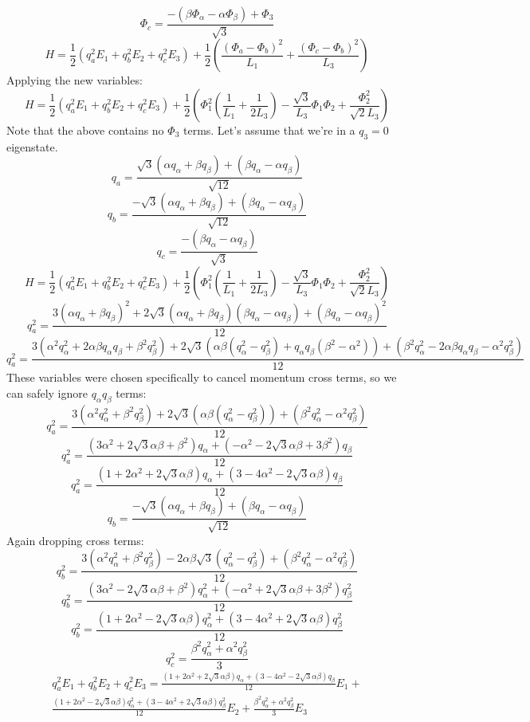 \documentclass[final]{article}
\begin{document}
\[\Phi_c=\frac{-(\beta \Phi_\alpha-\alpha \Phi_\beta)+\Phi_3}{\sqrt{3}}\]
\[H=\frac{1}{2}\left(q_a^2 E_1+q_b^2E_2+q_c^2E_3\right)+
\frac{1}{2}\left(\frac{(\Phi_a-\Phi_b)^2}{L_1}+\frac{(\Phi_c-\Phi_b)^2}{L_3}\right)\]
Applying the new variables:
\[H=\frac{1}{2}\left(q_a^2 E_1+ q_b^2 E_2+q_c^2 E_3\right)+
\frac{1}{2}\left(\Phi_1^2\left(\frac{1}{L_1}+\frac{1}{2L_3}\right)-\frac{\sqrt{3}}{L_3}\Phi_1\Phi_2+\frac{\Phi_2^2}{\sqrt{2}L_3}\right)\]
Note that the above contains no \(\Phi_3\) terms. Let's assume that we're in a \(q_3=0\) eigenstate.
\[q_a=\frac{\sqrt{3}(\alpha q_\alpha+\beta q_\beta)+(\beta q_\alpha-\alpha q_\beta)}{\sqrt{12}}\]
\[q_b=\frac{-\sqrt{3}(\alpha q_\alpha+\beta q_\beta)+(\beta q_\alpha-\alpha q_\beta)}{\sqrt{12}}\]
\[q_c=\frac{-(\beta q_\alpha-\alpha q_\beta)}{\sqrt{3}}\]
\[H=\frac{1}{2}\left(q_a^2 E_1+ q_b^2 E_2+q_c^2 E_3\right)+
\frac{1}{2}\left(\Phi_1^2\left(\frac{1}{L_1}+\frac{1}{2L_3}\right)-\frac{\sqrt{3}}{L_3}\Phi_1\Phi_2+\frac{\Phi_2^2}{\sqrt{2}L_3}\right)\]
\[q_a^2=\frac{3(\alpha q_\alpha+\beta q_\beta)^2+
2\sqrt{3}(\alpha q_\alpha+\beta q_\beta)(\beta q_\alpha-\alpha q_\beta)+(\beta q_\alpha-\alpha q_\beta)^2}{12}\]
\[q_a^2=\frac{3(\alpha^2 q_\alpha^2+2\alpha\beta q_\alpha q_\beta+\beta^2 q_\beta^2)+
2\sqrt{3}(\alpha\beta (q_\alpha^2-q_\beta^2)+q_\alpha q_\beta(\beta^2-\alpha^2))+(\beta^2 q_\alpha^2-2\alpha\beta q_\alpha q_\beta-\alpha^2 q_\beta^2)}{12}\]
These variables were chosen specifically to cancel momentum cross terms, so we can safely ignore \(q_\alpha q_\beta\) terms:
\[q_a^2=\frac{3(\alpha^2 q_\alpha^2+\beta^2 q_\beta^2)+
2\sqrt{3}(\alpha\beta (q_\alpha^2-q_\beta^2))+(\beta^2 q_\alpha^2-\alpha^2 q_\beta^2)}{12}\]
\[q_a^2=\frac{(3\alpha^2+2\sqrt{3}\alpha \beta+\beta^2)q_\alpha+(-\alpha^2-2\sqrt{3}\alpha \beta+3\beta^2)q_\beta}{12}\]
\[q_a^2=\frac{(1+2\alpha^2+2\sqrt{3}\alpha \beta)q_\alpha+(3-4\alpha^2-2\sqrt{3}\alpha \beta)q_\beta}{12}\]
\[q_b=\frac{-\sqrt{3}(\alpha q_\alpha+\beta q_\beta)+(\beta q_\alpha-\alpha q_\beta)}{\sqrt{12}}\]
Again dropping cross terms:
\[q_b^2=\frac{3(\alpha^2 q_\alpha^2+\beta^2 q_\beta^2)-2\alpha\beta\sqrt{3}(q_\alpha^2-q_\beta^2)+
(\beta^2 q_\alpha^2-\alpha^2 q_\beta^2)}{12}\]
\[q_b^2=\frac{(3\alpha^2-2\sqrt{3}\alpha \beta+\beta^2)q_\alpha^2+(-\alpha^2+2\sqrt{3}\alpha\beta+3\beta^2)q_\beta^2}{12}\]
\[q_b^2=\frac{(1+2\alpha^2-2\sqrt{3}\alpha \beta)q_\alpha^2+(3-4\alpha^2+2\sqrt{3}\alpha\beta)q_\beta^2}{12}\]
\[q_c^2=\frac{\beta^2 q_\alpha^2+\alpha^2 q_\beta^2}{3}\]
\begin{multline*}
q_a^2 E_1+ q_b^2 E_2+q_c^2 E_3=\frac{(1+2\alpha^2+2\sqrt{3}\alpha \beta)q_\alpha+(3-4\alpha^2-2\sqrt{3}\alpha \beta)q_\beta}{12} E_1+\\
\frac{(1+2\alpha^2-2\sqrt{3}\alpha \beta)q_\alpha^2+(3-4\alpha^2+2\sqrt{3}\alpha\beta)q_\beta^2}{12}E_2+
\frac{\beta^2 q_\alpha^2+\alpha^2 q_\beta^2}{3}E_3
\end{multline*}
\end{document}
